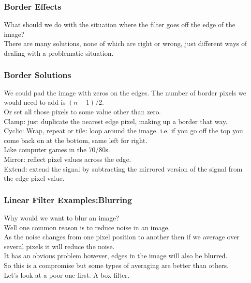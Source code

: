 \begin{frame}\frametitle{Border Effects}
What should we do with the situation where the filter goes off the edge of the image?\\
There are many solutions, none of which are right or wrong, just different ways of dealing with a problematic situation.\\
\end{frame}
\begin{frame}\frametitle{Border Solutions}
We could pad the image with zeros on the edges. The number of border pixels we would need to add is $(n-1)/2$.\\
Or set all those pixels to some value other than zero.\\
Clamp: just duplicate the nearest edge pixel, making up a border that way.\\
Cyclic: Wrap, repeat or tile: loop around the image. i.e. if you go off the top you come back on at the bottom, same left for right.\\ Like computer games in the 70/80s.\\
Mirror: reflect pixel values across the edge.\\ 
Extend: extend the signal by subtracting the mirrored version of the signal from the edge pixel value. 
\end{frame}

\begin{frame}\frametitle{Linear Filter Examples:Blurring}

Why would we want to blur an image? \\
Well one common reason is to reduce noise in an image.\\
As the noise changes from one pixel position to another then if we average over several pixels it will reduce the noise.\\
It has an obvious problem however, edges in the image will also be blurred. \\So this is a compromise but some types of averaging are better than others.\\
Let's look at a poor one first. A box filter.\\
\end{frame}


